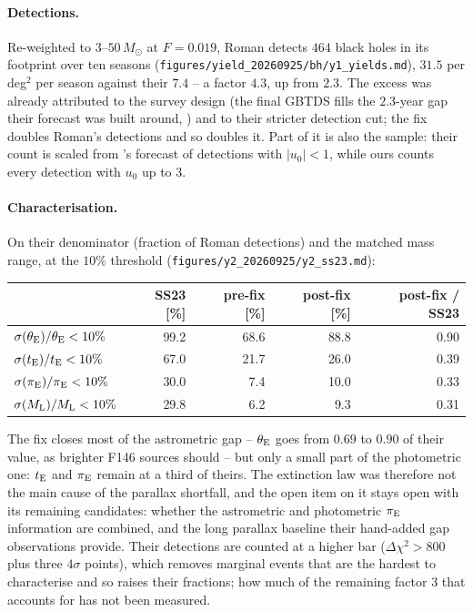 \documentclass[english,10pt,a4paper]{article}
\newcommand{\tE}{t_{\rm E}}
\newcommand{\piE}{\pi_{\rm E}}
\newcommand{\tetE}{\theta_{\rm E}}
\newcommand{\Ml}{M_{\rm L}}
\newcommand{\Msun}{M_\odot}
\begin{document}
\paragraph{Detections.} Re-weighted to $3$--$50\,\Msun$ at $F=0.019$, Roman detects $464$ black
holes in its footprint over ten seasons (\texttt{figures/yield\_20260925/bh/y1\_yields.md}),
$31.5$ per deg$^2$ per season against their $7.4$ -- a factor $4.3$, up from $2.3$. The excess was
already attributed to the survey design (the final GBTDS fills the $2.3$-year gap their forecast
was built around, \citealt{ROTAC2025}) and to their stricter detection cut; the fix doubles Roman's
detections and so doubles it. Part of it is also the sample: their count is scaled from
\citet{Penny2019}'s forecast of detections with $|u_0|<1$, while ours counts every detection with
$u_0$ up to $3$.

\paragraph{Characterisation.} On their denominator (fraction of Roman detections) and the
matched mass range, at the $10\%$ threshold (\texttt{figures/y2\_20260925/y2\_ss23.md}):

\begin{center}
\begin{tabular}{lrrrr}
\toprule
 & SS23 [\%] & pre-fix [\%] & post-fix [\%] & post-fix / SS23 \\
\midrule
$\sigma(\tetE)/\tetE < 10\%$ & 99.2 & 68.6 & 88.8 & 0.90 \\
$\sigma(\tE)/\tE < 10\%$     & 67.0 & 21.7 & 26.0 & 0.39 \\
$\sigma(\piE)/\piE < 10\%$   & 30.0 &  7.4 & 10.0 & 0.33 \\
$\sigma(\Ml)/\Ml < 10\%$     & 29.8 &  6.2 &  9.3 & 0.31 \\
\bottomrule
\end{tabular}
\end{center}

The fix closes most of the astrometric gap -- $\tetE$ goes from $0.69$ to $0.90$ of their value,
as brighter F146 sources should -- but only a small part of the photometric one: $\tE$ and $\piE$
remain at a third of theirs. The extinction law was therefore not the main cause of the parallax
shortfall, and the open item on it stays open with its remaining candidates: whether the
astrometric and photometric $\piE$ information are combined, and the long parallax baseline their
hand-added gap observations provide. Their detections are counted at a higher bar
($\Delta\chi^2>800$ plus three $4\sigma$ points), which removes marginal events that are the
hardest to characterise and so raises their fractions; how much of the remaining factor $3$ that
accounts for has not been measured.
\end{document}

